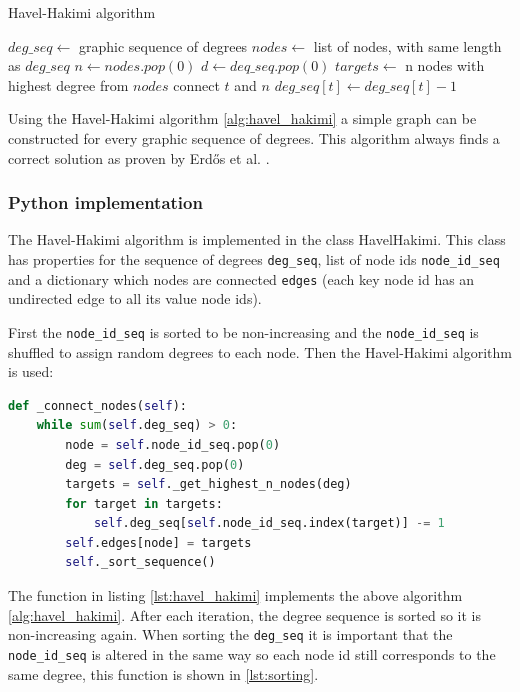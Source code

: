 \begin{algorithm}
\caption{Havel-Hakimi algorithm}
\label{alg:havel_hakimi}
\begin{algorithmic}
\State $deg\_seq \gets $ graphic sequence of degrees
\State $nodes \gets $ list of nodes, with same length as $deg\_seq$
    \State $n \gets nodes.pop(0)$
    \State $d \gets deq\_seq.pop(0)$
    \State $targets \gets $ n nodes with highest degree from $nodes$
        \State connect $t$ and $n$
        \State $deg\_seq[t] \gets deg\_seq[t] - 1$
    \EndFor
\EndWhile
\end{algorithmic}
\end{algorithm}

Using the Havel-Hakimi algorithm \ref{alg:havel_hakimi} a simple graph can be constructed for every graphic sequence of degrees. This algorithm always finds a correct solution as proven by Erdős et al. \cite{havelHakimi}.

\subsubsection{Python implementation}
The Havel-Hakimi algorithm is implemented in the class HavelHakimi. This class has properties for the sequence of degrees \texttt{deg\_seq}, list of node ids \texttt{node\_id\_seq} and a dictionary which nodes are connected \texttt{edges} (each key node id has an undirected edge to all its value node ids).

First the \texttt{node\_id\_seq} is sorted to be non-increasing and the \texttt{node\_id\_seq} is shuffled to assign random degrees to each node. Then the Havel-Hakimi algorithm is used:

\begin{lstlisting}[language=python, caption={Havel Hakimi Algorithm in Python}, label={lst:havel_hakimi}]
def _connect_nodes(self):
    while sum(self.deg_seq) > 0:
        node = self.node_id_seq.pop(0)
        deg = self.deg_seq.pop(0)
        targets = self._get_highest_n_nodes(deg)
        for target in targets:
            self.deg_seq[self.node_id_seq.index(target)] -= 1
        self.edges[node] = targets
        self._sort_sequence()
\end{lstlisting}

The function in listing \ref{lst:havel_hakimi} implements the above algorithm \ref{alg:havel_hakimi}. After each iteration, the degree sequence is sorted so it is non-increasing again. When sorting the \texttt{deg\_seq} it is important that the \texttt{node\_id\_seq} is altered in the same way so each node id still corresponds to the same degree, this function is shown in \ref{lst:sorting}.


